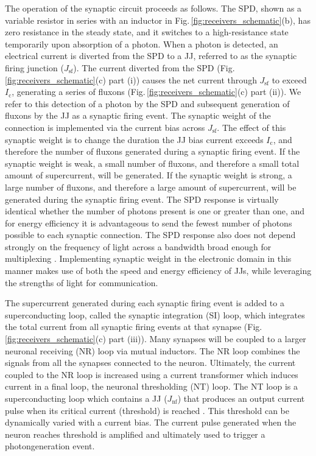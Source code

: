 \documentclass[twocolumn]{article}
\begin{document}
The operation of the synaptic circuit proceeds as follows. The SPD, shown as a variable resistor in series with an inductor in Fig.\,\ref{fig:receivers_schematic}(b), has zero resistance in the steady state, and it switches to a high-resistance state temporarily upon absorption of a photon. When a photon is detected, an electrical current is diverted from the SPD to a JJ, referred to as the synaptic firing junction ($J_{\mathrm{sf}}$). The current diverted from the SPD (Fig.\,\ref{fig:receivers_schematic}(c) part (i)) causes the net current through $J_{\mathrm{sf}}$ to exceed $I_{\mathrm{c}}$, generating a series of fluxons (Fig.\,\ref{fig:receivers_schematic}(c) part (ii)). We refer to this detection of a photon by the SPD and subsequent generation of fluxons by the JJ as a synaptic firing event. The synaptic weight of the connection is implemented via the current bias across $J_{\mathrm{sf}}$. The effect of this synaptic weight is to change the duration the JJ bias current exceeds $I_{\mathrm{c}}$, and therefore the number of fluxons generated during a synaptic firing event. If the synaptic weight is weak, a small number of fluxons, and therefore a small total amount of supercurrent, will be generated. If the synaptic weight is strong, a large number of fluxons, and therefore a large amount of supercurrent, will be generated during the synaptic firing event. The SPD response is virtually identical whether the number of photons present is one or greater than one, and for energy efficiency it is advantageous to send the fewest number of photons possible to each synaptic connection. The SPD response also does not depend strongly on the frequency of light across a bandwidth broad enough for multiplexing \cite{mave2013}. Implementing synaptic weight in the electronic domain in this manner makes use of both the speed and energy efficiency of JJs, while leveraging the strengths of light for communication.  

The supercurrent generated during each synaptic firing event is added to a superconducting loop, called the synaptic integration (SI) loop, which integrates the total current from all synaptic firing events at that synapse (Fig.\,\ref{fig:receivers_schematic}(c) part (iii)). Many synapses will be coupled to a larger neuronal receiving (NR) loop via mutual inductors. The NR loop combines the signals from all the synapses connected to the neuron. Ultimately, the current coupled to the NR loop is increased using a current transformer which induces current in a final loop, the neuronal thresholding (NT) loop. The NT loop is a superconducting loop which contains a JJ ($J_{\mathrm{nf}}$) that produces an output current pulse when its critical current (threshold) is reached \cite{crsc2010}. This threshold can be dynamically varied with a current bias. The current pulse generated when the neuron reaches threshold is amplified and ultimately used to trigger a photon\textendash generation event.
\end{document}
